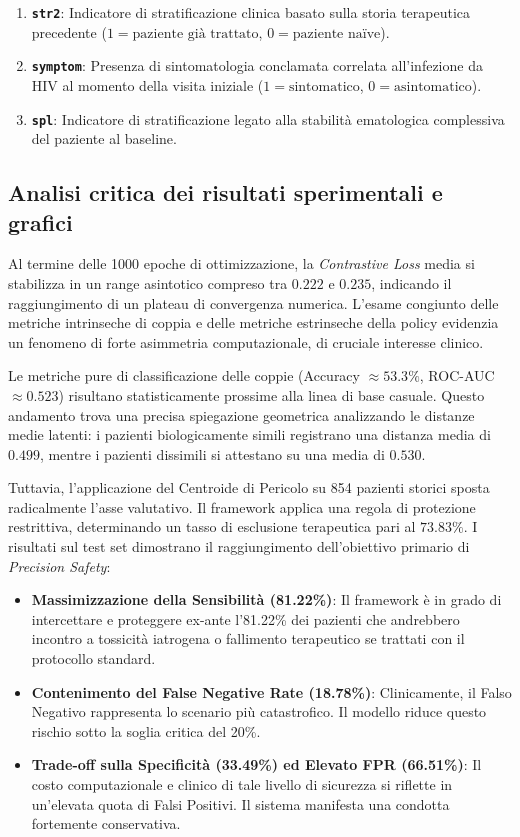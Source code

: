 \documentclass{article}
\begin{document}
\begin{enumerate}
    \textbf{\texttt{gender}}: Sesso biologico assegnato alla nascita ($0 = \text{femmina}$, $1 = \text{maschio}$).
    \item \textbf{\texttt{str2}}: Indicatore di stratificazione clinica basato sulla storia terapeutica precedente ($1 = \text{paziente già trattato}$, $0 = \text{paziente na\"{i}ve}$).
    \item \textbf{\texttt{symptom}}: Presenza di sintomatologia conclamata correlata all'infezione da HIV al momento della visita iniziale ($1 = \text{sintomatico}$, $0 = \text{asintomatico}$).
    \item \textbf{\texttt{spl}}: Indicatore di stratificazione legato alla stabilità ematologica complessiva del paziente al baseline.
\end{enumerate}

\newpage
\subsection{Analisi critica dei risultati sperimentali e grafici}
Al termine delle 1000 epoche di ottimizzazione, la \textit{Contrastive Loss} media si stabilizza in un range asintotico compreso tra $0.222$ e $0.235$, indicando il raggiungimento di un plateau di convergenza numerica. L'esame congiunto delle metriche intrinseche di coppia e delle metriche estrinseche della policy evidenzia un fenomeno di forte asimmetria computazionale, di cruciale interesse clinico.

Le metriche pure di classificazione delle coppie (Accuracy $\approx 53.3\%$, ROC-AUC $\approx 0.523$) risultano statisticamente prossime alla linea di base casuale. Questo andamento trova una precisa spiegazione geometrica analizzando le distanze medie latenti: i pazienti biologicamente simili registrano una distanza media di $0.499$, mentre i pazienti dissimili si attestano su una media di $0.530$. 

Tuttavia, l'applicazione del Centroide di Pericolo su 854 pazienti storici sposta radicalmente l'asse valutativo. Il framework applica una regola di protezione restrittiva, determinando un tasso di esclusione terapeutica pari al $73.83\%$. I risultati sul test set dimostrano il raggiungimento dell'obiettivo primario di \textit{Precision Safety}:
\begin{itemize}
    \item \textbf{Massimizzazione della Sensibilità (81.22\%)}: Il framework è in grado di intercettare e proteggere ex-ante l'81.22\% dei pazienti che andrebbero incontro a tossicità iatrogena o fallimento terapeutico se trattati con il protocollo standard. 
    \item \textbf{Contenimento del False Negative Rate (18.78\%)}: Clinicamente, il Falso Negativo rappresenta lo scenario più catastrofico. Il modello riduce questo rischio sotto la soglia critica del 20\%.
    \item \textbf{Trade-off sulla Specificità (33.49\%) ed Elevato FPR (66.51\%)}: Il costo computazionale e clinico di tale livello di sicurezza si riflette in un'elevata quota di Falsi Positivi. Il sistema manifesta una condotta fortemente conservativa.
\end{itemize}
\end{document}

